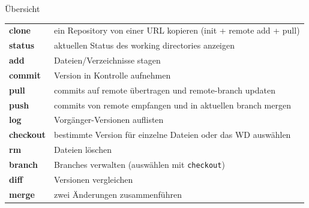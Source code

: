 \documentclass[compress,t,usenames,dvipsnames]{beamer}
\begin{document}
\begin{frame}{Übersicht}
    {\scriptsize
        \begin{tabular}{p{2.5cm}l}
            \textbf{clone}
                & ein Repository von einer URL kopieren (init + remote add + pull)\\
            \textbf{status}
                & aktuellen Status des working directories anzeigen\\
            \textbf{add}
                & Dateien/Verzeichnisse stagen\\
            \textbf{commit}
                & Version in Kontrolle aufnehmen\\
            \textbf{pull}
                & commits auf remote übertragen und remote-branch updaten\\
            \textbf{push}
                & commits von remote empfangen und in aktuellen branch mergen\\
            \textbf{log}
                & Vorgänger-Versionen auflisten\\
            \textbf{checkout}
                & bestimmte Version für einzelne Dateien oder
                das WD auswählen\\
            \textbf{rm}
                & Dateien löschen\\
            \textbf{branch}
                & Branches verwalten (auswählen mit \texttt{checkout})\\
            \textbf{diff}
                & Versionen vergleichen\\
            \textbf{merge}
                & zwei Änderungen zusammenführen\\
        \end{tabular}
    }
\end{frame}
\end{document}
